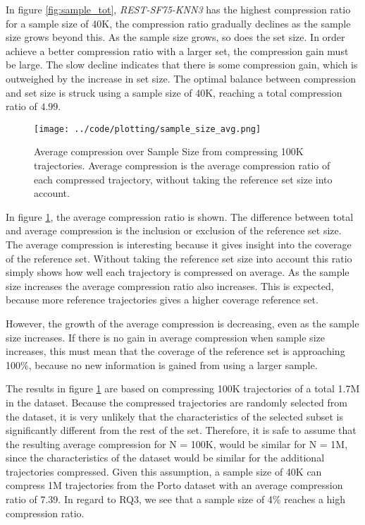 In figure \ref{fig:sample_tot}, \textit{REST-SF75-KNN3} has the highest compression ratio for a sample size of 40K, the compression ratio gradually declines as the sample size grows beyond this. As the sample size grows, so does the set size. In order achieve a better compression ratio with a larger set, the compression gain must be large. The slow decline indicates that there is some compression gain, which is outweighed by the increase in set size. The optimal balance between compression and set size is struck using a sample size of 40K, reaching a total compression ratio of $4.99$.

\begin{figure}[h]
    \begin{minipage}{0.99\linewidth}
        \centering
        \texttt{[image: ../code/plotting/sample\_size\_avg.png]}
        \caption{Average compression over Sample Size from compressing 100K trajectories. Average compression is the average compression ratio of each compressed trajectory, without taking the reference set size into account.}
        \label{fig:sample_avg}
    \end{minipage}
\end{figure}

In figure \ref{fig:sample_avg}, the average compression ratio is shown. The difference between total and average compression is the inclusion or exclusion of the reference set size. The average compression is interesting because it gives insight into the coverage of the reference set. Without taking the reference set size into account this ratio simply shows how well each trajectory is compressed on average. As the sample size increases the average compression ratio also increases. This is expected, because more reference trajectories gives a higher coverage reference set.

However, the growth of the average compression is decreasing, even as the sample size increases. If there is no gain in average compression when sample size increases, this must mean that the coverage of the reference set is approaching 100\%, because no new information is gained from using a larger sample.

The results in figure \ref{fig:sample_avg} are based on compressing 100K trajectories of a total 1.7M in the dataset. Because the compressed trajectories are randomly selected from the dataset, it is very unlikely that the characteristics of the selected subset is significantly different from the rest of the set. Therefore, it is safe to assume that the resulting average compression for N = 100K, would be similar for N = 1M, since the characteristics of the dataset would be similar for the additional trajectories compressed. Given this assumption, a sample size of 40K can compress 1M trajectories from the Porto dataset with an average compression ratio of 7.39. In regard to RQ3, we see that a sample size of 4\% reaches a high compression ratio.

